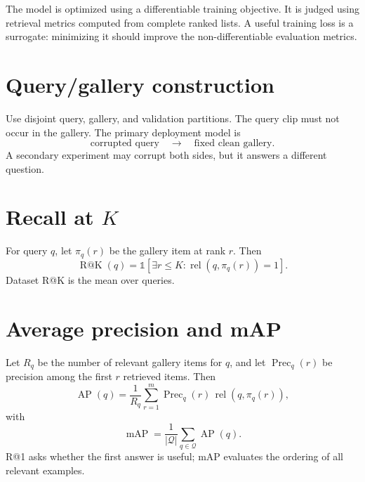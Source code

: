 \documentclass[11pt,oneside,openany]{book}
\theoremstyle{myplain}
\theoremstyle{definition}
\newcommand{\ind}{\mathds{1}}
\newcommand{\card}[1]{\left|#1\right|}
\begin{document}
\begin{conceptbox}[title=Training loss and evaluation metric are different]
The model is optimized using a differentiable training objective. It is judged using retrieval metrics computed from complete ranked lists. A useful training loss is a surrogate: minimizing it should improve the non-differentiable evaluation metrics.
\end{conceptbox}



\section{Query/gallery construction}

Use disjoint query, gallery, and validation partitions. The query clip must not occur in the gallery. The primary deployment model is
\[
\text{corrupted query}\quad\longrightarrow\quad\text{fixed clean gallery}.
\]
A secondary experiment may corrupt both sides, but it answers a different question.

\section{Recall at $K$}

For query $q$, let $\pi_q(r)$ be the gallery item at rank $r$. Then
\begin{equation}
  \operatorname{R@K}(q)=
  \ind\left[\exists r\le K:\operatorname{rel}(q,\pi_q(r))=1\right].
  \label{eq:recallk}
\end{equation}
Dataset R@K is the mean over queries.

\section{Average precision and mAP}

Let $R_q$ be the number of relevant gallery items for $q$, and let $\operatorname{Prec}_q(r)$ be precision among the first $r$ retrieved items. Then
\begin{equation}
  \operatorname{AP}(q)=\frac{1}{R_q}
  \sum_{r=1}^{m}\operatorname{Prec}_q(r)\,
  \operatorname{rel}(q,\pi_q(r)),
  \label{eq:ap}
\end{equation}
with
\begin{equation}
  \operatorname{mAP}=\frac{1}{\card{\mathcal Q}}
  \sum_{q\in\mathcal Q}\operatorname{AP}(q).
  \label{eq:map}
\end{equation}
R@1 asks whether the first answer is useful; mAP evaluates the ordering of all relevant examples.
\end{document}
